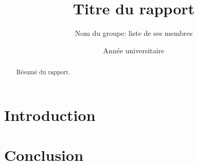 \documentclass[a4paper,11pt]{article}
\title{Titre du rapport}
\author{Nom du groupe: liste de ses membres}
\date{Année universitaire}
\begin{document}
\maketitle

\begin{abstract}
  Résumé du rapport.
\end{abstract}


\section{Introduction}




\section{Conclusion}




\end{document}
